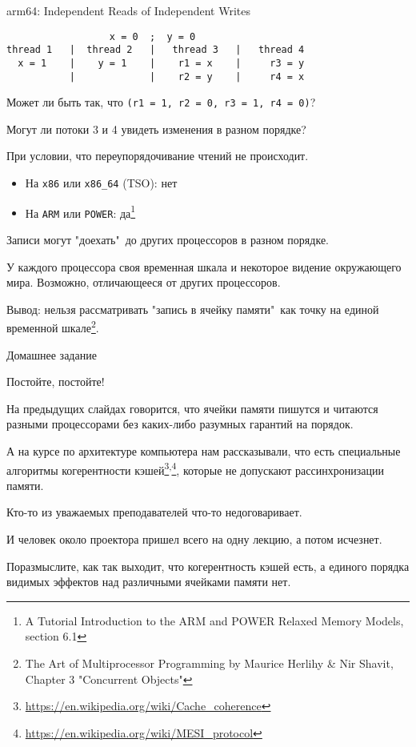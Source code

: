 \begin{frame}[fragile]{arm64: Independent Reads of Independent Writes}

\begin{adjustbox}{width=0.9\textwidth,height=1.5cm,keepaspectratio}
\begin{lstlisting}
                  x = 0  ;  y = 0
thread 1   |  thread 2   |   thread 3   |   thread 4
  x = 1    |    y = 1    |    r1 = x    |     r3 = y
           |             |    r2 = y    |     r4 = x
\end{lstlisting}
\end{adjustbox}

\pause
Может ли быть так, что \texttt{(r1 = 1, r2 = 0, r3 = 1, r4 = 0)}?

\pause
Могут ли потоки 3 и 4 увидеть изменения в разном порядке?

\pause
При условии, что переупорядочивание чтений не происходит.

\pause
\begin{itemize}
\item На \texttt{x86} или \texttt{x86\_64} (TSO): нет

\pause
\item На \texttt{ARM} или \texttt{POWER}: да\footnote<6->{\tiny A Tutorial Introduction to the ARM and POWER Relaxed Memory Models, section 6.1}
\end{itemize}

\pause
Записи могут "доехать"\ до других процессоров в разном порядке.

\pause
У каждого процессора своя временная шкала и некоторое видение окружающего мира. Возможно, отличающееся от других процессоров.

\pause
Вывод: нельзя рассматривать "запись в ячейку памяти"\ как точку на единой временной шкале\footnote<9->{\tiny The Art of Multiprocessor Programming by Maurice Herlihy \& Nir Shavit, Chapter 3 "Concurrent Objects"}.
\end{frame}


\begin{frame}{Домашнее задание}

Постойте, постойте!

\pause
На предыдущих слайдах говорится, что ячейки памяти пишутся и читаются разными процессорами без каких-либо разумных гарантий на порядок.

\pause
А на курсе по архитектуре компьютера нам рассказывали, что есть специальные алгоритмы когерентности кэшей\footnote<3->{\tiny\url{https://en.wikipedia.org/wiki/Cache_coherence}}\textsuperscript{,}\footnote<3->{\tiny\url{https://en.wikipedia.org/wiki/MESI_protocol}}, которые не допускают рассинхронизации памяти.

\pause
Кто-то из уважаемых преподавателей что-то недоговаривает.

\pause
И человек около проектора пришел всего на одну лекцию, а потом исчезнет.

\pause
Поразмыслите, как так выходит, что когерентность кэшей есть, а единого порядка видимых эффектов над различными ячейками памяти нет.
\end{frame}


